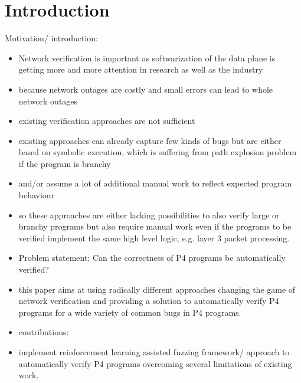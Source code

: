 \section{Introduction}
Motivation/ introduction:
\begin{itemize}
    \item Network verification is important as softwarization of the data plane is getting more and more attention in research as well as the industry
    \item because network outages are costly and small errors can lead to whole network outages
    \item existing verification approaches are not sufficient
    \item existing approaches can already capture few kinds of bugs but are either based on symbolic execution, which is suffering from path explosion problem if the program is branchy
    \item and/or assume a lot of additional manual work to reflect expected program behaviour
    \item so these approaches are either lacking possibilities to also verify large or branchy programs but also require manual work even if the programs to be verified implement the same high level logic, e.g. layer 3 packet processing.
    \item Problem statement: Can the correctness of P4 programs be automatically verified?
    \item this paper aims at using radically different approaches changing the game of network verification and providing a solution to automatically verify P4 programs for a wide variety of common bugs in P4 programs.
    \item contributions: 
    \item implement reinforcement learning assisted fuzzing framework/ approach to automatically verify P4 programs overcoming several limitations of existing work.
    
\end{itemize}

